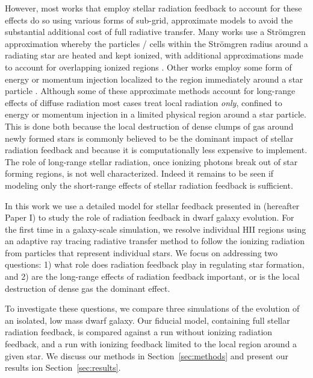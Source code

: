 \documentclass[twocolumn]{aastex62}
\begin{document}
However, most works that employ stellar radiation feedback to account for these effects do so using various forms of sub-grid, approximate models to avoid the substantial additional cost of full radiative transfer. Many works use a Str{\"o}mgren approximation whereby the particles / cells within the Str{\"o}mgren radius around a radiating star are heated and kept ionized, with additional approximations made to account for overlapping ionized regions \citep[e.g.][]{HQM2011,Hu2016,Hu2017}. Other works employ some form of energy or momentum injection localized to the region immediately around a star particle \citep[e.g.][]{Agertz2013,Roskar2014,Ceverino2014,Forbes2016}. Although some of these approximate methods account for long-range effects of diffuse radiation \citep{HQM2012,Hopkins2018} most cases treat local radiation {\it only}, confined to energy or momentum injection in a limited physical region around a star particle. This is done both because the local destruction of dense clumps of gas around newly formed stars is commonly believed to be the dominant impact of stellar radiation feedback and because it is computationally less expensive to implement. The role of long-range stellar radiation, once ionizing photons break out of star forming regions, is not well characterized. Indeed it remains to be seen if modeling only the short-range effects of stellar radiation feedback is sufficient.

In this work we use a detailed model for stellar feedback presented in \cite{Emerick2018} (hereafter Paper I) to study the role of radiation feedback in dwarf galaxy evolution. For the first time in a galaxy-scale simulation, we resolve individual HII regions using an adaptive ray tracing radiative transfer method to follow the ionizing radiation from particles that represent individual stars. We focus on addressing two questions: 1) what role does radiation feedback play in regulating star formation, and 2) are the long-range effects of radiation feedback important, or is the local destruction of dense gas the dominant effect.

To investigate these questions, we compare three simulations of the evolution of an isolated, low mass dwarf galaxy. Our fiducial model, containing full stellar radiation feedback, is compared against a run without ionizing radiation feedback, and a run with ionizing feedback limited to the local region around a given star. We discuss our methods in Section~\ref{sec:methods} and present our results ion Section~\ref{sec:results}.
\end{document}
